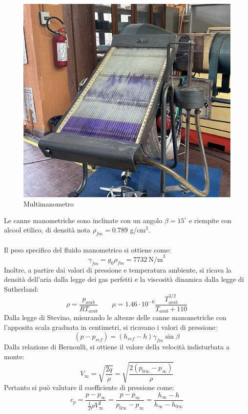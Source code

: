 \begin{figure}[H]
    \centering
    \includegraphics[width=.8\textwidth]{images/5/multimanometro.jpg}
    \caption{Multimanometro}
\end{figure}

\noindent Le canne manometriche sono inclinate con un angolo $\beta=15^\circ$ e riempite con alcool etilico, di densità nota $\rho_{fm} = 0.789$ g/cm$^3$.\\\\
Il peso specifico del fluido manometrico si ottiene come:
\begin{equation*}
    \gamma_{fm} = g_0 \rho_{fm} = 7732\ \text{N/m}^3
\end{equation*}
Inoltre, a partire dai valori di pressione e temperatura ambiente, si ricava la densità dell'aria dalla legge dei gas perfetti e la viscosità dinamica dalla legge di Sutherland:
\begin{equation*}
    \rho = \frac{p_{amb}}{RT_{amb}} \qquad \mu = 1.46\cdot10^{-6} \frac{T_{amb}^{3/2}}{T_{amb}+110}
\end{equation*}
Dalla legge di Stevino, misurando le altezze delle canne manometriche con l'apposita scala graduata in centimetri, si ricavano i valori di pressione:
\begin{equation*}
    (p-p_{ref}) = (h_{ref}-h) \gamma_{fm} \sin \beta
\end{equation*}
Dalla relazione di Bernoulli, si ottiene il valore della velocità indisturbata a monte:
\begin{equation*}
    V_\infty = \sqrt{\frac{2q}\rho} = \sqrt{\frac{2(p_{0\infty}-p_\infty)}{\rho}}
\end{equation*}
Pertanto si può valutare il coefficiente di pressione come:
\begin{equation*}
    c_p = \frac{p-p_{\infty}}{\frac12 \rho V_\infty^2} = \frac{p-p_\infty}{p_{0\infty}-p_\infty} = \frac{h_\infty-h}{h_\infty-h_{0\infty}}
\end{equation*}

